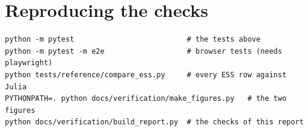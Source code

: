 \documentclass[11pt,a4paper]{article}
\begin{document}
\section{Reproducing the checks}

\begin{verbatim}
python -m pytest                          # the tests above
python -m pytest -m e2e                   # browser tests (needs playwright)
python tests/reference/compare_ess.py     # every ESS row against Julia
PYTHONPATH=. python docs/verification/make_figures.py   # the two figures
python docs/verification/build_report.py  # the checks of this report
\end{verbatim}
\end{document}
